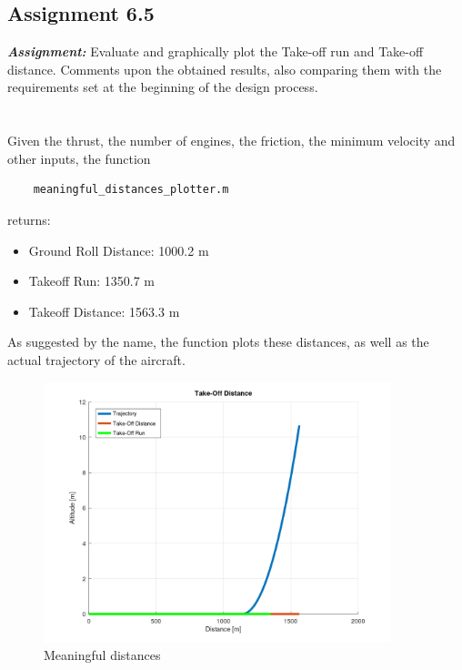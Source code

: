 \documentclass{article}
\begin{document}
\subsection{Assignment 6.5\label{Assignment_6.5}}

\textbf{\textit{Assignment:}} Evaluate and graphically plot the Take-off run and Take-off distance.
Comments upon the obtained results, also comparing them 
with the requirements set at the beginning of the design process. \\ \\ \\ 

Given the thrust, the number of engines, the friction, the minimum velocity and other inputs, the function \autocite{Airbus_replacement_repo}

\begin{verbatim}
    meaningful_distances_plotter.m
\end{verbatim}

returns:

\begin{itemize}
    \item Ground Roll Distance: 1000.2 m
    \item Takeoff Run: 1350.7 m
    \item Takeoff Distance: 1563.3 m
\end{itemize}

As suggested by the name, the function plots these distances, as well as the actual trajectory of the aircraft. \\ 

\begin{figure}[h!]
    \centering
    \includegraphics[width=0.9\textwidth]{Sources/Plots_and_Pictures/Distances.png}
    \caption{Meaningful distances}
    \label{distances}
\end{figure}
\end{document}

